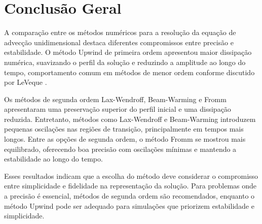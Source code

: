 \section{Conclusão Geral}

A comparação entre os métodos numéricos para a resolução da equação de advecção unidimensional destaca diferentes compromissos entre precisão e estabilidade. O método Upwind de primeira ordem apresentou maior dissipação numérica, suavizando o perfil da solução e reduzindo a amplitude ao longo do tempo, comportamento comum em métodos de menor ordem conforme discutido por LeVeque \cite{leveque2002finite}.

Os métodos de segunda ordem Lax-Wendroff, Beam-Warming e Fromm apresentaram uma preservação superior do perfil inicial e uma dissipação reduzida. Entretanto, métodos como Lax-Wendroff e Beam-Warming introduzem pequenas oscilações nas regiões de transição, principalmente em tempos mais longos. Entre as opções de segunda ordem, o método Fromm se mostrou mais equilibrado, oferecendo boa precisão com oscilações mínimas e mantendo a estabilidade ao longo do tempo.

Esses resultados indicam que a escolha do método deve considerar o compromisso entre simplicidade e fidelidade na representação da solução. Para problemas onde a precisão é essencial, métodos de segunda ordem são recomendados, enquanto o método Upwind pode ser adequado para simulações que priorizem estabilidade e simplicidade.
